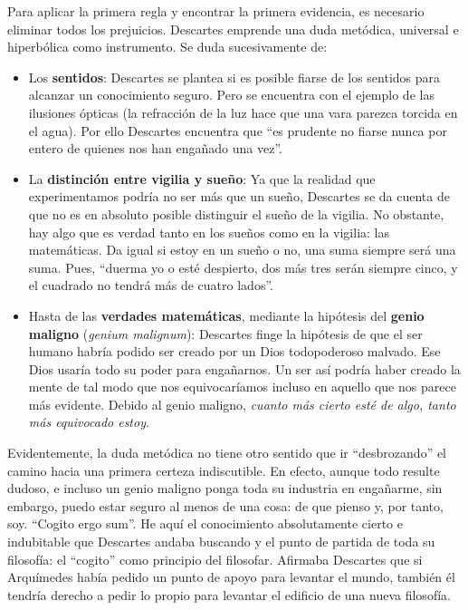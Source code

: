 \documentclass[10pt]{article}
\begin{document}
Para aplicar la primera regla y encontrar la primera evidencia, es necesario eliminar todos los prejuicios. Descartes emprende una duda metódica, universal e hiperbólica como
instrumento. Se duda sucesivamente de:

\begin{itemize}
  \item Los \textbf{sentidos}: Descartes se plantea si es posible fiarse de los sentidos para alcanzar un conocimiento seguro. Pero se encuentra con el ejemplo de las ilusiones
    ópticas (la refracción de la luz hace que una vara parezca torcida en el agua). Por ello Descartes encuentra que ``es prudente no fiarse nunca por entero de quienes nos han
    engañado una vez''.
  \item La \textbf{distinción entre vigilia y sueño}: Ya que la realidad que experimentamos podría no ser más que un sueño, Descartes se da cuenta de que no es en absoluto posible
    distinguir el sueño de la vigilia. No obstante, hay algo que es verdad tanto en los sueños como en la vigilia: las matemáticas. Da igual si estoy en un sueño o no, una suma
    siempre será una suma. Pues, ``duerma yo o esté despierto, dos más tres serán siempre cinco, y el cuadrado no tendrá más de cuatro lados''.
  \item Hasta de las \textbf{verdades matemáticas}, mediante la hipótesis del \textbf{genio maligno} (\textit{genium malignum}): Descartes finge la hipótesis de que el ser humano
    habría podido ser creado por un Dios todopoderoso malvado. Ese Dios usaría todo su poder para engañarnos. Un ser así podría haber creado la mente de tal modo que nos
    equivocaríamos incluso en aquello que nos parece más evidente. Debido al genio maligno, \textit{cuanto más cierto esté de algo, tanto más equivocado estoy}.
\end{itemize}

Evidentemente, la duda metódica no tiene otro sentido que ir “desbrozando” el camino hacia una primera certeza indiscutible. En efecto, aunque todo resulte dudoso, 
e incluso un genio maligno ponga toda su industria en engañarme, sin embargo, puedo estar seguro al menos de una cosa: de que pienso y, por tanto, soy. ``Cogito ergo sum''.
He aquí el conocimiento absolutamente cierto e indubitable que Descartes andaba buscando y el punto de partida de toda su filosofía: el “cogito” como principio del
filosofar. Afirmaba Descartes que si Arquímedes había pedido un punto de apoyo para levantar el mundo, también él tendría derecho a pedir lo propio para levantar el
edificio de una nueva filosofía.
\end{document}

